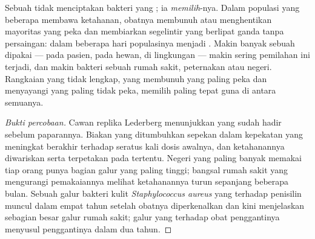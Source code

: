 \begin{proposition}\label{prop:g11:antibiotic-resistance:selection}
Sebuah  tidak menciptakan bakteri yang ; ia
\emph{memilih}-nya. Dalam populasi yang beberapa  membawa 
ketahanan, obatnya membunuh atau menghentikan mayoritas yang peka dan
membiarkan segelintir yang  berlipat ganda tanpa persaingan: dalam
beberapa hari populasinya menjadi . Makin banyak sebuah 
dipakai --- pada pasien, pada hewan, di lingkungan --- makin sering
pemilahan ini terjadi, dan makin  bakteri sebuah rumah sakit,
peternakan atau negeri. Rangkaian yang tidak lengkap, yang membunuh 
yang paling peka dan menyayangi yang paling tidak peka, memilih paling
tepat guna di antara semuanya.
\end{proposition}
\begin{proof}[Bukti percobaan]
Cawan replika Lederberg menunjukkan  yang  sudah hadir sebelum
paparannya. Biakan yang ditumbuhkan sepekan dalam kepekatan 
yang meningkat berakhir  terhadap seratus kali dosis awalnya, dan
ketahanannya diwariskan serta terpetakan pada  tertentu. Negeri
yang paling banyak memakai  tiap orang punya bagian galur
yang  paling tinggi; bangsal rumah sakit yang mengurangi
pemakaiannya melihat ketahanannya turun sepanjang beberapa bulan.
Sebuah galur bakteri kulit \emph{Staphylococcus aureus} yang 
terhadap penisilin muncul dalam empat tahun setelah obatnya
diperkenalkan dan kini menjelaskan sebagian besar galur rumah sakit;
galur yang  terhadap obat penggantinya menyusul penggantinya dalam
dua tahun.
\end{proof}

